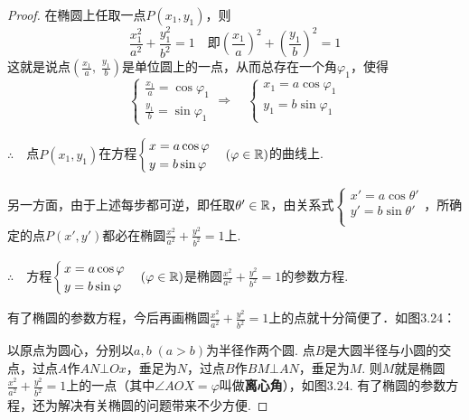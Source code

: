 \begin{proof}
在椭圆上任取一点$P(x_1,y_1)$，则
\[\frac{x_1^2}{a^2}+\frac{y_1^2}{b^2}=1 \quad \text{即} \left(\frac{x_1}{a}\right)^2+\left(\frac{y_1}{b}\right)^2=1\]
这就是说点$\left(\frac{x_1}{a},\; \frac{y_1}{b}\right)$是单位圆上的一点，从而总存在一个角$\varphi_1$，使得
\[\begin{cases}
    \frac{x_1}{a}=\cos\varphi_1 \\[1.5ex]
    \frac{y_1}{b}=\sin\varphi_1 
\end{cases}\Rightarrow \quad \begin{cases}
    x_1=a\cos\varphi_1\\
    y_1=b\sin\varphi_1\\
\end{cases}\]

$\therefore\quad $点$P(x_1,y_1)$在方程$\begin{cases}
    x=a\cos\varphi\\
    y=b\sin\varphi\\
\end{cases}(\varphi\in\mathbb{R})$的曲线上.

另一方面，由于上述每步都可逆，即任取$\theta'\in\mathbb{R}$，由关系式$\begin{cases}
    x'=a\cos\theta'\\
    y'=b\sin\theta'\\
\end{cases}$，所确定的点$P(x',y')$都必在椭圆$\frac{x^2}{a^2}+\frac{y^2}{b^2}=1$上.

$\therefore\quad $方程$\begin{cases}
    x=a\cos\varphi\\
    y=b\sin\varphi\\
\end{cases}(\varphi\in\mathbb{R})$是椭圆$\frac{x^2}{a^2}+\frac{y^2}{b^2}=1$的参数方程.

有了椭圆的参数方程，今后再画椭圆$\frac{x^2}{a^2}+\frac{y^2}{b^2}=1$上的点就十分简便了．如图3.24：

\noindent
\begin{minipage}{.48\textwidth}\CTEXindent
以原点为圆心，分别以$a, b\; (a>b)$为半径作两个圆. 点$B$是大圆半径与小圆的交点，过点$A$作$AN\bot Ox$，垂足为$N$，过点$B$作$BM\bot AN$，垂足为$M$. 则$M$就是椭圆$\frac{x^2}{a^2}+\frac{y^2}{b^2}=1$上的一点（其中$\angle AOX=\varphi$叫做\textbf{离心角}），如图3.24. 有了椭圆的参数方程，还为解决有关椭圆的问题带来不少方便.
\end{minipage}
\hfill
\begin{minipage}{.5\textwidth}
\centering
{}
\end{minipage}
\end{proof}

